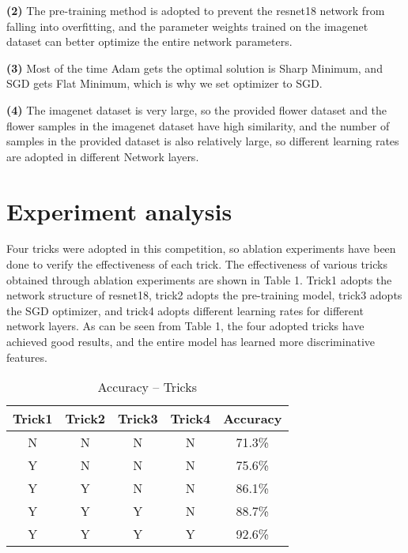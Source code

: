 \documentclass[10pt,twocolumn,letterpaper]{article}
\begin{document}
\textbf{(2)} The pre-training method is adopted to prevent the resnet18 network from falling into overfitting, and the parameter weights trained on the imagenet dataset can better optimize the entire network parameters.~\cite{https://doi.org/10.48550/arxiv.1905.00546}

\textbf{(3)} Most of the time Adam gets the optimal solution is Sharp Minimum, and SGD gets Flat Minimum, which is why we set optimizer to SGD.~\cite{https://doi.org/10.48550/arxiv.2002.07839}

\textbf{(4)} The imagenet dataset is very large, so the provided flower dataset and the flower samples in the imagenet dataset have high similarity, and the number of samples in the provided dataset is also relatively large, so different learning rates are adopted in different Network layers.~\cite{10.5555/1756006.1756025}


\section{Experiment analysis}

Four tricks were adopted in this competition, so ablation experiments have been done to verify the effectiveness of each trick. 
The effectiveness of various tricks obtained through ablation experiments are shown in Table 1. 
Trick1 adopts the network structure of resnet18, trick2 adopts the pre-training model, trick3 adopts the SGD optimizer, and trick4 adopts different learning rates for different network layers. 
As can be seen from Table 1, the four adopted tricks have achieved good results, and the entire model has learned more discriminative features.

\begin{table}[htb]
	\begin{center}
		\caption{Accuracy -- Tricks}
		\label{table:1}
		\begin{tabular}{|c|c|c|c|c|}
			\hline   \textbf{Trick1} & \textbf{Trick2} & \textbf{Trick3} &  \textbf{Trick4} & \textbf{Accuracy}\\
			\hline   N & N & N & N & 71.3\%  \\
			\hline   Y & N & N & N & 75.6\% \\
			\hline   Y & Y & N & N & 86.1\% \\
			\hline   Y & Y & Y & N & 88.7\% \\
			\hline   Y & Y & Y & Y & 92.6\% \\
			\hline
		\end{tabular}
	\end{center}
\end{table}
\end{document}
